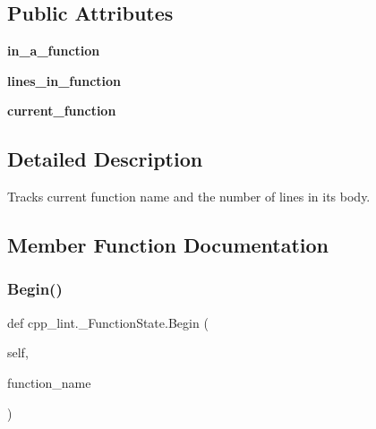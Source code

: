 \subsection*{Public Attributes}
\begin{DoxyCompactItemize}
\item 
\mbox{\label{classcpp__lint_1_1___function_state_a8ccc7032a246c6218b3fd950ee4a45ca}} 
{\bfseries in\+\_\+a\+\_\+function}
\item 
\mbox{\label{classcpp__lint_1_1___function_state_aee01500c694fa93573b3ff7f64efe67b}} 
{\bfseries lines\+\_\+in\+\_\+function}
\item 
\mbox{\label{classcpp__lint_1_1___function_state_a879802c532e1629fb10b703ec1a4e126}} 
{\bfseries current\+\_\+function}
\end{DoxyCompactItemize}


\subsection{Detailed Description}
\begin{DoxyVerb}Tracks current function name and the number of lines in its body.\end{DoxyVerb}
 

\subsection{Member Function Documentation}
\mbox{\label{classcpp__lint_1_1___function_state_a91b36d276e1cf17350786a0510516674}} 
\subsubsection{\texorpdfstring{Begin()}{Begin()}}
{\footnotesize\ttfamily def cpp\+\_\+lint.\+\_\+\+Function\+State.\+Begin (\begin{DoxyParamCaption}\item[{}]{self,  }\item[{}]{function\+\_\+name }\end{DoxyParamCaption})}

